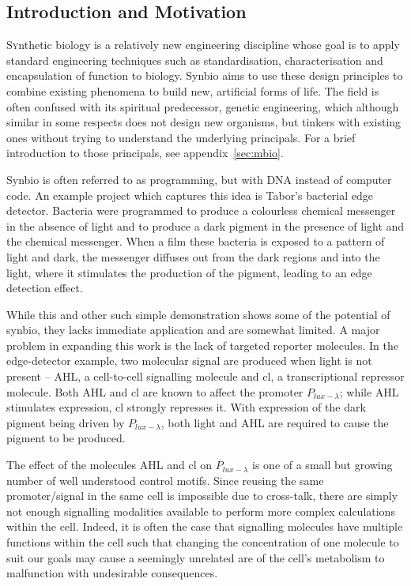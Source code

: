 \documentclass[twoside,a4paper]{article}
\begin{document}
\begin{multicols}{2} %

\section{Introduction and Motivation}

\lettrine[nindent=0em,lines=3]{S} ynthetic biology is a relatively new
engineering discipline whose goal is to apply standard engineering techniques
such as standardisation, characterisation and encapsulation of function to 
biology.
Synbio aims to use these design principles to combine existing phenomena to 
build new, artificial forms of life.
The field is often confused with its spiritual predecessor, genetic 
engineering, which although similar in some respects does not design new
organisms, but tinkers with existing ones without trying to understand the
underlying principals.
For a brief introduction to those principals, see appendix~\ref{sec:mbio}.

Synbio is often referred to as programming, but with DNA instead of computer
code.
An example project which captures this idea is Tabor's bacterial edge
detector\cite{edgeDetector}.
Bacteria were programmed to produce a colourless chemical messenger in the 
absence of light and to produce a dark pigment in the presence of light and the
chemical messenger.
When a film these bacteria is exposed to a pattern of light and dark, the
messenger diffuses out from the dark regions and into the light, where it
stimulates the production of the pigment, leading to an edge detection effect.

While this and other such simple demonstration shows some of the potential 
of synbio, they lacks immediate application and are somewhat limited.
A major problem in expanding this work is the lack of targeted reporter
molecules.
In the edge-detector example, two molecular signal are produced when light is not 
present -- AHL, a cell-to-cell signalling molecule and cl, a
transcriptional repressor molecule.
Both AHL and cl are known to affect the promoter $P_{lux-\lambda}$; while AHL 
stimulates expression, cl strongly represses it.
With expression of the dark pigment being driven by $P_{lux-\lambda}$, 
both light and AHL are required to cause the pigment to be produced.

The effect of the molecules AHL and cl on $P_{lux-\lambda}$ is one of a small
but growing number of well understood control motifs.
Since reusing the same promoter/signal in the same cell is impossible due to 
cross-talk, there are simply not enough signalling modalities available to
perform more complex calculations within the cell.
Indeed, it is often the case that signalling molecules have multiple functions
within the cell such that changing the concentration of one molecule to suit
our goals may cause a seemingly unrelated are of the cell's metabolism to
malfunction with undesirable consequences.


\end{multicols}
\end{document}
